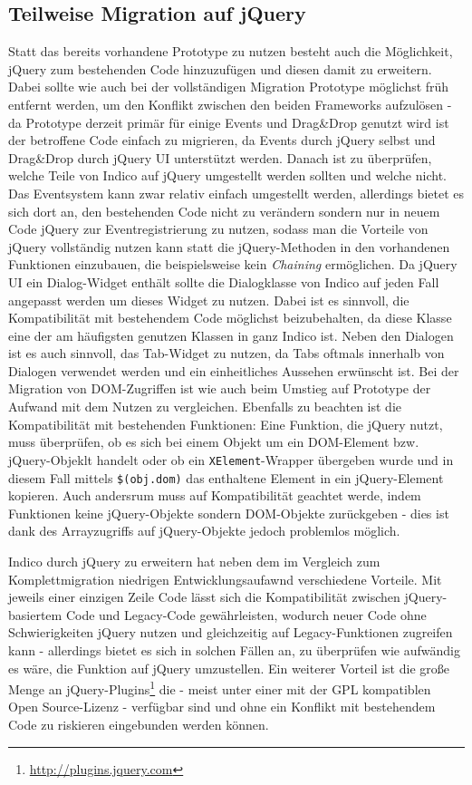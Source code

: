 \subsection{Teilweise Migration auf jQuery}
Statt das bereits vorhandene Prototype zu nutzen besteht auch die Möglichkeit, jQuery zum
bestehenden Code hinzuzufügen und diesen damit zu erweitern. Dabei sollte wie auch bei der
vollständigen Migration Prototype möglichst früh entfernt werden, um den Konflikt zwischen den
beiden Frameworks aufzulösen - da Prototype derzeit primär für einige Events und Drag\&Drop genutzt
wird ist der betroffene Code einfach zu migrieren, da Events durch jQuery selbst und Drag\&Drop
durch jQuery UI unterstützt werden. Danach ist zu überprüfen, welche Teile von Indico auf jQuery
umgestellt werden sollten und welche nicht. Das Eventsystem kann zwar relativ einfach umgestellt
werden, allerdings bietet es sich dort an, den bestehenden Code nicht zu verändern sondern nur in
neuem Code jQuery zur Eventregistrierung zu nutzen, sodass man die Vorteile von jQuery vollständig
nutzen kann statt die jQuery-Methoden in den vorhandenen Funktionen einzubauen, die beispielsweise
kein \emph{Chaining} ermöglichen. Da jQuery UI ein Dialog-Widget enthält sollte die Dialogklasse von
Indico auf jeden Fall angepasst werden um dieses Widget zu nutzen. Dabei ist es sinnvoll, die
Kompatibilität mit bestehendem Code möglichst beizubehalten, da diese Klasse eine der am häufigsten
genutzen Klassen in ganz Indico ist. Neben den Dialogen ist es auch sinnvoll, das Tab-Widget zu
nutzen, da Tabs oftmals innerhalb von Dialogen verwendet werden und ein einheitliches Aussehen
erwünscht ist. Bei der Migration von DOM-Zugriffen ist wie auch beim Umstieg auf Prototype der
Aufwand mit dem Nutzen zu vergleichen. Ebenfalls zu beachten ist die Kompatibilität mit bestehenden
Funktionen: Eine Funktion, die jQuery nutzt, muss überprüfen, ob es sich bei einem Objekt um ein
DOM-Element bzw. jQuery-Objeklt handelt oder ob ein \lstinline{XElement}-Wrapper übergeben wurde und
in diesem Fall mittels \lstinline{$(obj.dom)} das enthaltene Element in ein jQuery-Element
kopieren. Auch andersrum muss auf Kompatibilität geachtet werde, indem Funktionen keine
jQuery-Objekte sondern DOM-Objekte zurückgeben - dies ist dank des Arrayzugriffs auf jQuery-Objekte
jedoch problemlos möglich.

Indico durch jQuery zu erweitern hat neben dem im Vergleich zum Komplettmigration niedrigen
Entwicklungsaufawnd verschiedene Vorteile. Mit jeweils einer einzigen Zeile Code lässt sich die
Kompatibilität zwischen jQuery-basiertem Code und Legacy-Code gewährleisten, wodurch neuer Code ohne
Schwierigkeiten jQuery nutzen und gleichzeitig auf Legacy-Funktionen zugreifen kann - allerdings
bietet es sich in solchen Fällen an, zu überprüfen wie aufwändig es wäre, die Funktion auf jQuery
umzustellen. Ein weiterer Vorteil ist die große Menge an
jQuery-Plugins\footnote{\href{http://plugins.jquery.com}{http://plugins.jquery.com}} die - meist
unter einer mit der GPL kompatiblen Open Source-Lizenz - verfügbar sind und ohne ein Konflikt mit
bestehendem Code zu riskieren eingebunden werden können.



